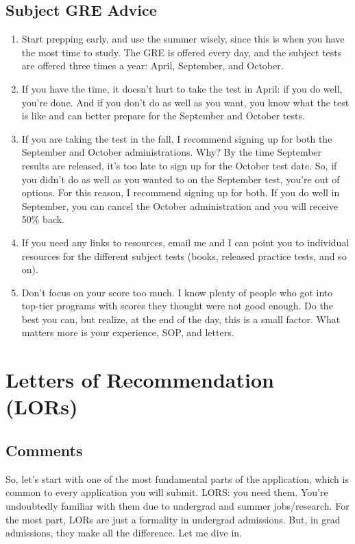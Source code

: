 \documentclass[12pt]{article}
\begin{document}
\subsection{Subject GRE Advice}
\begin{enumerate}
\item Start prepping early, and use the summer wisely, since this is when you have the most time to study. The GRE is offered every day, and the subject tests are offered three times a year: April, September, and October.

\item If you have the time, it doesn't hurt to take the test in April: if you do well, you're done. And if you don't do as well as you want, you know what the test is like and can better prepare for the September and October tests.

\item If you are taking the test in the fall, I recommend signing up for both the September and October administrations. Why? By the time September results are released, it's too late to sign up for the October test date. So, if you didn't do as well as you wanted to on the September test, you're out of options. For this reason, I recommend signing up for both. If you do well in September, you can cancel the October administration and you will receive 50\% back.

\item If you need any links to resources, email me and I can point you to individual resources for the different subject tests (books, released practice tests, and so on).

\item Don't focus on your score too much. I know plenty of people who got into top-tier programs with scores they thought were not good enough. Do the best you can, but realize, at the end of the day, this is a small factor. What matters more is your experience, SOP, and letters.
\end{enumerate}

\section{Letters of Recommendation (LORs)}
\subsection{Comments}
So, let's start with one of the most fundamental parts of the application, which is common to every application you will submit. LORS: you need them. You're undoubtedly familiar with them due to undergrad and summer jobs/research. For the most part, LORs are just a formality in undergrad admissions. But, in grad admissions, they make all the difference. Let me dive in.
\end{document}
